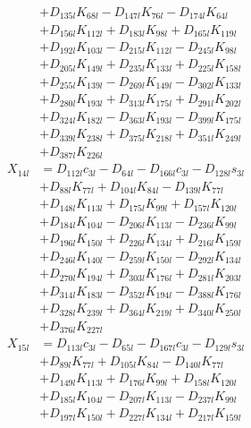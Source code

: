 \begin{multicols}{2}
\begin{align}
&+ D_{135l}K_{68l} - D_{147l}K_{76l} - D_{174l}K_{64l}  \nonumber \\
&+ D_{156l}K_{112l} + D_{183l}K_{98l} + D_{165l}K_{119l}  \nonumber \\
&+ D_{192l}K_{103l} - D_{215l}K_{112l} - D_{245l}K_{98l}  \nonumber \\
&+ D_{205l}K_{149l} + D_{235l}K_{133l} + D_{225l}K_{158l}  \nonumber \\
&+ D_{255l}K_{139l} - D_{269l}K_{149l} - D_{302l}K_{133l}  \nonumber \\
&+ D_{280l}K_{193l} + D_{313l}K_{175l} + D_{291l}K_{202l}  \nonumber \\
&+ D_{324l}K_{182l} - D_{363l}K_{193l} - D_{399l}K_{175l}  \nonumber \\
&+ D_{339l}K_{238l} + D_{375l}K_{218l} + D_{351l}K_{249l}  \nonumber \\
&+ D_{387l}K_{226l} \nonumber \\
X_{14l} &= D_{112l}c_{3l} - D_{64l} - D_{166l}c_{3l} - D_{128l}s_{3l}  \nonumber \\
&+ D_{88l}K_{77l} + D_{104l}K_{84l} - D_{139l}K_{77l}  \nonumber \\
&+ D_{148l}K_{113l} + D_{175l}K_{99l} + D_{157l}K_{120l}  \nonumber \\
&+ D_{184l}K_{104l} - D_{206l}K_{113l} - D_{236l}K_{99l}  \nonumber \\
&+ D_{196l}K_{150l} + D_{226l}K_{134l} + D_{216l}K_{159l}  \nonumber \\
&+ D_{246l}K_{140l} - D_{259l}K_{150l} - D_{292l}K_{134l}  \nonumber \\
&+ D_{270l}K_{194l} + D_{303l}K_{176l} + D_{281l}K_{203l}  \nonumber \\
&+ D_{314l}K_{183l} - D_{352l}K_{194l} - D_{388l}K_{176l}  \nonumber \\
&+ D_{328l}K_{239l} + D_{364l}K_{219l} + D_{340l}K_{250l}  \nonumber \\
&+ D_{376l}K_{227l} \nonumber \\
X_{15l} &= D_{113l}c_{3l} - D_{65l} - D_{167l}c_{3l} - D_{129l}s_{3l}  \nonumber \\
&+ D_{89l}K_{77l} + D_{105l}K_{84l} - D_{140l}K_{77l}  \nonumber \\
&+ D_{149l}K_{113l} + D_{176l}K_{99l} + D_{158l}K_{120l}  \nonumber \\
&+ D_{185l}K_{104l} - D_{207l}K_{113l} - D_{237l}K_{99l}  \nonumber \\
&+ D_{197l}K_{150l} + D_{227l}K_{134l} + D_{217l}K_{159l}  \nonumber \\

\end{align}
\end{multicols}
